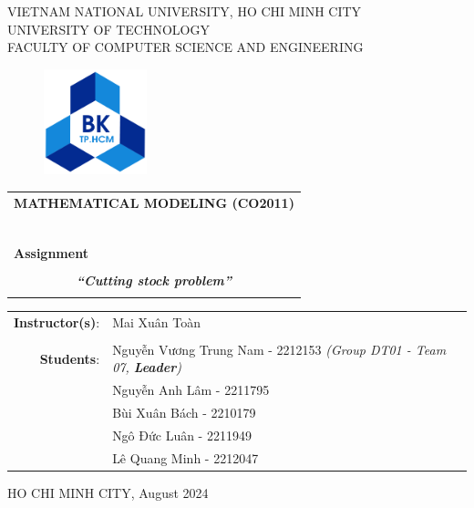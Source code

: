 \documentclass[a4paper]{article}
\begin{document}
\fontsize{13pt}{15pt}\selectfont
\begin{titlepage}
\begin{center}
VIETNAM NATIONAL UNIVERSITY, HO CHI MINH CITY \\
UNIVERSITY OF TECHNOLOGY \\
FACULTY OF COMPUTER SCIENCE AND ENGINEERING
\end{center}

\vspace{1cm}

\begin{figure}[h!]
\begin{center}
\includegraphics[width=3cm]{hcmut.png}
\end{center}
\end{figure}

\vspace{1cm}


\begin{center}
\begin{tabular}{c}
\multicolumn{1}{l}{\textbf{{\Large MATHEMATICAL MODELING (CO2011)}}}\\
~~\\
\hline
\\
\multicolumn{1}{l}{\textbf{{\Large Assignment}}}\\
\\
\textbf{\textit{{\Huge “Cutting stock problem”}}}\\
\\
\hline
\end{tabular}
\end{center}

\vspace{1.5cm}

\begin{table}[h]
\centering
    \begin{tabular}{rl}
    \hspace{3 cm}\textbf{Instructor(s)}:
    & Mai Xuân Toàn\\

    & \\[10pt]
    \textbf{Students}: &  Nguyễn Vương Trung Nam - 2212153 \emph{(Group DT01 - Team 07, \textbf{Leader})} \\
    &  Nguyễn Anh Lâm - 2211795 \\
    &  Bùi Xuân Bách - 2210179 \\
    &  Ngô Đức Luân - 2211949 \\
    &  Lê Quang Minh - 2212047 \\
    \end{tabular}
\end{table}

\begin{center}
{\footnotesize HO CHI MINH CITY, August 2024}
\end{center}
\end{titlepage}
\end{document}
